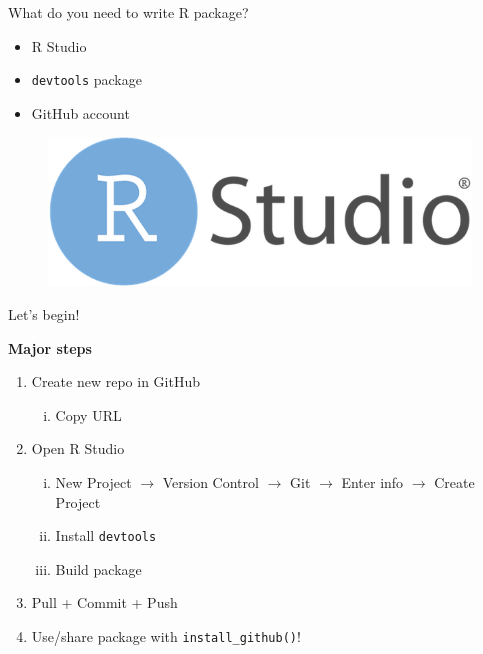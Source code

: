 \documentclass[
  ignorenonframetext,
]{beamer}
\providecommand{\tightlist}{%
  \setlength{\itemsep}{0pt}\setlength{\parskip}{0pt}}
\begin{document}
\begin{frame}[fragile]{What do you need to write R package?}
\protect\hypertarget{what-do-you-need-to-write-r-package}{}

\begin{itemize}
\tightlist
\item
  R Studio
\item
  \texttt{devtools} package
\item
  GitHub account
\end{itemize}

\begin{figure}
  \includegraphics[scale=0.2]{slides_files/figure-beamer/Rstudio.png}
\end{figure}

\end{frame}

\begin{frame}[fragile]{Let's begin!}
\protect\hypertarget{lets-begin}{}

\textbf{Major steps}

\begin{enumerate}
\tightlist
\item
  Create new repo in GitHub

  \begin{enumerate}
  [i)]
  \tightlist
  \item
    Copy URL
  \end{enumerate}
\item
  Open R Studio

  \begin{enumerate}
  [i)]
  \tightlist
  \item
    New Project \(\rightarrow\) Version Control \(\rightarrow\) Git
    \(\rightarrow\) Enter info \(\rightarrow\) Create Project
  \item
    Install \texttt{devtools}
  \item
    Build package
  \end{enumerate}
\item
  Pull + Commit + Push
\item
  Use/share package with \texttt{install\_github()}!
\end{enumerate}

\end{frame}
\end{document}
